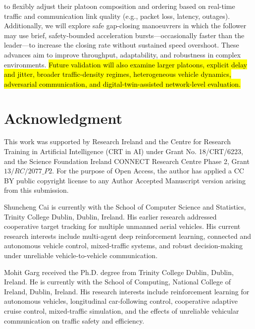 \documentclass{ieeeaccess}
\begin{document}
to flexibly adjust their platoon composition and ordering based on real-time traffic and communication link quality (e.g., packet loss, latency, outages). Additionally, we will explore safe gap-closing manoeuvrers in which the follower may use brief, safety-bounded acceleration bursts—occasionally faster than the leader—to increase the closing rate without sustained speed overshoot. These advances aim to improve throughput, adaptability, and robustness in complex environments. \hl{Future validation will also examine larger platoons, explicit delay and jitter, broader traffic-density regimes, heterogeneous vehicle dynamics, adversarial communication, and digital-twin-assisted network-level evaluation.} %

\section*{Acknowledgment}
This work was supported by Research Ireland and the Centre for Research Training in Artificial Intelligence (CRT in AI) under Grant No. 18/CRT/6223, and the Science Foundation Ireland CONNECT Research Centre Phase 2, Grant $13/RC/2077\_P2$. For the purpose of Open Access, the author has applied a CC BY public copyright license to any Author Accepted Manuscript version arising from this submission.






\begin{IEEEbiographynophoto}{Shuncheng Cai}
is currently with the School of Computer Science and Statistics, Trinity
College Dublin, Dublin, Ireland. His earlier research addressed cooperative
target tracking for multiple unmanned aerial vehicles. His current research
interests include multi-agent deep reinforcement learning, connected and
autonomous vehicle control, mixed-traffic systems, and robust decision-making
under unreliable vehicle-to-vehicle communication.
\end{IEEEbiographynophoto}


\begin{IEEEbiographynophoto}{Mohit Garg}
received the Ph.D. degree from Trinity College Dublin, Dublin, Ireland. He is
currently with the School of Computing, National College of Ireland, Dublin,
Ireland. His research interests include reinforcement learning for autonomous
vehicles, longitudinal car-following control, cooperative adaptive cruise
control, mixed-traffic simulation, and the effects of unreliable vehicular
communication on traffic safety and efficiency.
\end{IEEEbiographynophoto}
\end{document}
